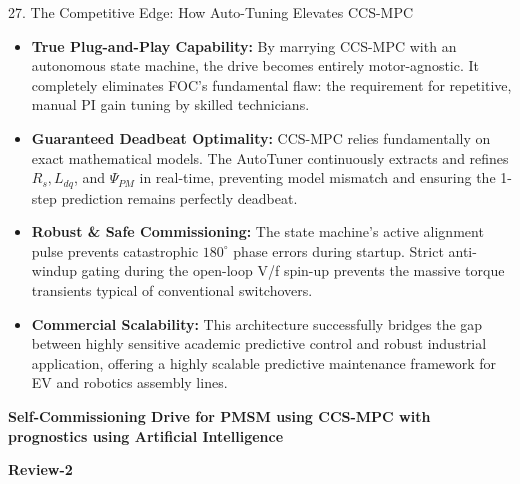 \documentclass[aspectratio=169]{beamer}
\begin{document}
\begin{frame}{27. The Competitive Edge: How Auto-Tuning Elevates CCS-MPC}
    \begin{itemize}
        \item \textbf{True Plug-and-Play Capability:} By marrying CCS-MPC with an autonomous state machine, the drive becomes entirely motor-agnostic. It completely eliminates FOC's fundamental flaw: the requirement for repetitive, manual PI gain tuning by skilled technicians.
        \item \textbf{Guaranteed Deadbeat Optimality:} CCS-MPC relies fundamentally on exact mathematical models. The AutoTuner continuously extracts and refines $R_s, L_{dq}$, and $\Psi_{PM}$ in real-time, preventing model mismatch and ensuring the 1-step prediction remains perfectly deadbeat.
        \item \textbf{Robust \& Safe Commissioning:} The state machine's active alignment pulse prevents catastrophic $180^\circ$ phase errors during startup. Strict anti-windup gating during the open-loop V/f spin-up prevents the massive torque transients typical of conventional switchovers.
        \item \textbf{Commercial Scalability:} This architecture successfully bridges the gap between highly sensitive academic predictive control and robust industrial application, offering a highly scalable predictive maintenance framework for EV and robotics assembly lines.
    \end{itemize}
\end{frame}


\begin{frame}
    \centering
    \vfill
    {\Large \textbf{Self-Commissioning Drive for PMSM using CCS-MPC with prognostics using Artificial Intelligence}\par}
    \vspace{6mm}
    {\Huge \textbf{Review-2}\par}
    \vfill
\end{frame}

\end{document}
